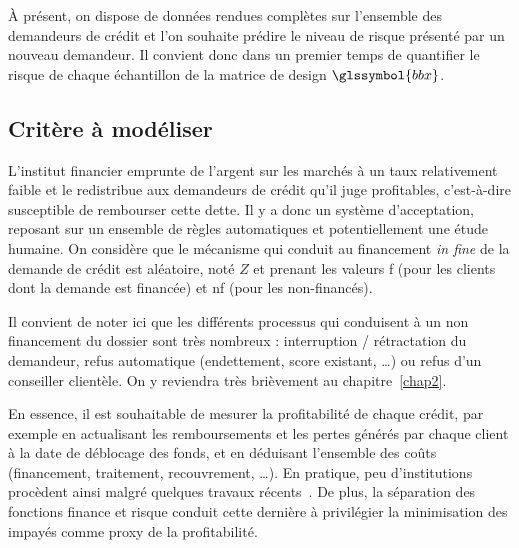 \`A présent, on dispose de données rendues complètes sur l'ensemble des demandeurs de crédit et l'on souhaite prédire le niveau de risque présenté par un nouveau demandeur. Il convient donc dans un premier temps de quantifier le risque de chaque échantillon de la matrice de design $\glssymbol{bbx}$.

\subsection{Critère à modéliser} \label{subsec:critere}

L'institut financier emprunte de l'argent sur les marchés à un taux relativement faible et le redistribue aux demandeurs de crédit qu'il juge profitables, c'est-à-dire susceptible de rembourser cette dette. Il y a donc un système d'acceptation, reposant sur un ensemble de règles automatiques et potentiellement une étude humaine. On considère que le mécanisme qui conduit au financement \textit{in fine} de la demande de crédit est aléatoire, noté $Z$ et prenant les valeurs f (pour les clients dont la demande est financée) et nf (pour les non-financés).

Il convient de noter ici que les différents processus qui conduisent à un non financement du dossier sont très nombreux : interruption / rétractation du demandeur, refus automatique (endettement, score existant, \dots) ou refus d'un conseiller clientèle. On y reviendra très brièvement au chapitre~\ref{chap2}.

En essence, il est souhaitable de mesurer la profitabilité de chaque crédit, par exemple en actualisant les remboursements et les pertes générés par chaque client à la date de déblocage des fonds, et en déduisant l'ensemble des coûts (financement, traitement, recouvrement, \dots). En pratique, peu d'institutions procèdent ainsi malgré quelques travaux récents~\cite{finlay2010credit}. De plus, la séparation des fonctions finance et risque conduit cette dernière à privilégier la minimisation des impayés comme proxy de la profitabilité.

